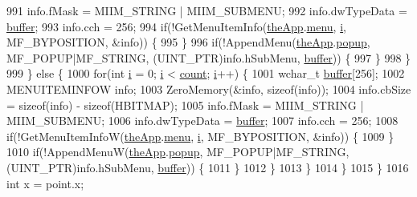 \begin{DoxyCode}
991             info.fMask = MIIM\_STRING | MIIM\_SUBMENU;
992             info.dwTypeData = \mbox{\hyperlink{_g_b_a_8cpp_a28d4d3d8445e73a696b2d6f7eadabd96}{buffer}};
993             info.cch = 256;
994             \textcolor{keywordflow}{if}(!GetMenuItemInfo(\mbox{\hyperlink{_v_b_a_8cpp_a8095a9d06b37a7efe3723f3218ad8fb3}{theApp}}.\mbox{\hyperlink{class_v_b_a_acf9d855b5b959a2df9c6cb21b888366e}{menu}}, \mbox{\hyperlink{expr-lex_8cpp_acb559820d9ca11295b4500f179ef6392}{i}}, MF\_BYPOSITION, &info)) \{
995             \}
996             \textcolor{keywordflow}{if}(!AppendMenu(\mbox{\hyperlink{_v_b_a_8cpp_a8095a9d06b37a7efe3723f3218ad8fb3}{theApp}}.\mbox{\hyperlink{class_v_b_a_ae9de0b5d432ad2e8a21faf040182fe03}{popup}}, MF\_POPUP|MF\_STRING, (UINT\_PTR)info.hSubMenu, 
      \mbox{\hyperlink{_g_b_a_8cpp_a28d4d3d8445e73a696b2d6f7eadabd96}{buffer}})) \{
997             \}
998           \}
999         \} \textcolor{keywordflow}{else} \{
1000           \textcolor{keywordflow}{for}(\textcolor{keywordtype}{int} \mbox{\hyperlink{expr-lex_8cpp_acb559820d9ca11295b4500f179ef6392}{i}} = 0; \mbox{\hyperlink{expr-lex_8cpp_acb559820d9ca11295b4500f179ef6392}{i}} < \mbox{\hyperlink{expr_8cpp_a16ff2d8e15ade4948398b0aeb80124a8}{count}}; \mbox{\hyperlink{expr-lex_8cpp_acb559820d9ca11295b4500f179ef6392}{i}}++) \{
1001             \textcolor{keywordtype}{wchar\_t} \mbox{\hyperlink{_g_b_a_8cpp_a28d4d3d8445e73a696b2d6f7eadabd96}{buffer}}[256];
1002             MENUITEMINFOW info;
1003             ZeroMemory(&info, \textcolor{keyword}{sizeof}(info));
1004             info.cbSize = \textcolor{keyword}{sizeof}(info) - \textcolor{keyword}{sizeof}(HBITMAP);
1005             info.fMask = MIIM\_STRING | MIIM\_SUBMENU;
1006             info.dwTypeData = \mbox{\hyperlink{_g_b_a_8cpp_a28d4d3d8445e73a696b2d6f7eadabd96}{buffer}};
1007             info.cch = 256;
1008             \textcolor{keywordflow}{if}(!GetMenuItemInfoW(\mbox{\hyperlink{_v_b_a_8cpp_a8095a9d06b37a7efe3723f3218ad8fb3}{theApp}}.\mbox{\hyperlink{class_v_b_a_acf9d855b5b959a2df9c6cb21b888366e}{menu}}, \mbox{\hyperlink{expr-lex_8cpp_acb559820d9ca11295b4500f179ef6392}{i}}, MF\_BYPOSITION, &info)) \{
1009             \}
1010             \textcolor{keywordflow}{if}(!AppendMenuW(\mbox{\hyperlink{_v_b_a_8cpp_a8095a9d06b37a7efe3723f3218ad8fb3}{theApp}}.\mbox{\hyperlink{class_v_b_a_ae9de0b5d432ad2e8a21faf040182fe03}{popup}}, MF\_POPUP|MF\_STRING, (UINT\_PTR)info.hSubMenu, 
      \mbox{\hyperlink{_g_b_a_8cpp_a28d4d3d8445e73a696b2d6f7eadabd96}{buffer}})) \{
1011             \}
1012           \}
1013         \}
1014       \}
1015     \}
1016     \textcolor{keywordtype}{int} x = point.x;

\end{DoxyCode}
